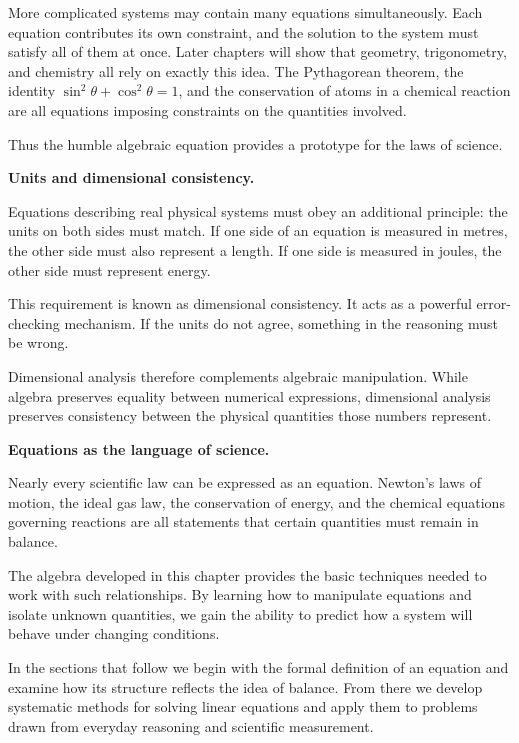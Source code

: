 \documentclass[11pt, openany]{book}
\theoremstyle{plain}
\theoremstyle{definition}
\theoremstyle{remark}
\begin{document}
More complicated systems may contain many equations simultaneously. Each
equation contributes its own constraint, and the solution to the system
must satisfy all of them at once. Later chapters will show that geometry,
trigonometry, and chemistry all rely on exactly this idea. The
Pythagorean theorem, the identity $\sin^2\theta+\cos^2\theta=1$, and the
conservation of atoms in a chemical reaction are all equations imposing
constraints on the quantities involved.

Thus the humble algebraic equation provides a prototype for the laws of
science.

\medskip

\textbf{Units and dimensional consistency.}

Equations describing real physical systems must obey an additional
principle: the units on both sides must match. If one side of an equation
is measured in metres, the other side must also represent a length. If
one side is measured in joules, the other side must represent energy.

This requirement is known as dimensional consistency. It acts as a
powerful error-checking mechanism. If the units do not agree, something
in the reasoning must be wrong.

Dimensional analysis therefore complements algebraic manipulation. While
algebra preserves equality between numerical expressions, dimensional
analysis preserves consistency between the physical quantities those
numbers represent.

\medskip

\textbf{Equations as the language of science.}

Nearly every scientific law can be expressed as an equation. Newton’s
laws of motion, the ideal gas law, the conservation of energy, and the
chemical equations governing reactions are all statements that certain
quantities must remain in balance.

The algebra developed in this chapter provides the basic techniques
needed to work with such relationships. By learning how to manipulate
equations and isolate unknown quantities, we gain the ability to predict
how a system will behave under changing conditions.

In the sections that follow we begin with the formal definition of an
equation and examine how its structure reflects the idea of balance.
From there we develop systematic methods for solving linear equations and
apply them to problems drawn from everyday reasoning and scientific
measurement.
\end{document}
